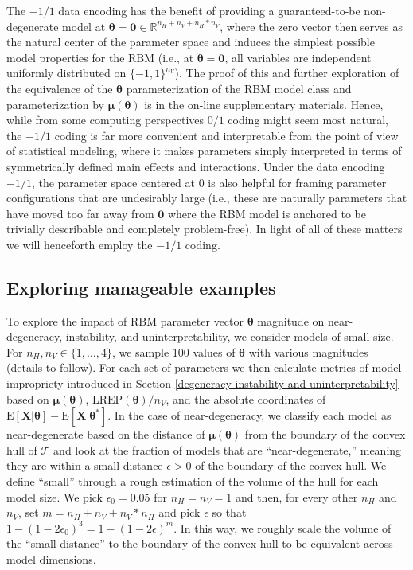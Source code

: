 \documentclass[]{article}
\theoremstyle{definition}
\newcommand{\nv}{{n_{\scriptscriptstyle V}}}
\newcommand{\nh}{{n_{\scriptscriptstyle H}}}
\begin{document}
The \(-1/1\) data encoding has the benefit of providing a
guaranteed-to-be non-degenerate model at
\(\boldsymbol \theta = \boldsymbol 0 \in \mathbb{R}^{\nh + \nv + \nh*\nv}\),
where the zero vector then serves as the natural center of the parameter
space and induces the simplest possible model properties for the RBM
(i.e., at \(\boldsymbol \theta = \boldsymbol 0\), all variables are
independent uniformly distributed on \(\{-1,1\}^\nv\)). The proof of
this and further exploration of the equivalence of the
\(\boldsymbol \theta\) parameterization of the RBM model class and
parameterization by \(\boldsymbol \mu(\boldsymbol \theta)\) is in the
on-line supplementary materials. Hence, while from some computing
perspectives \(0/1\) coding might seem most natural, the \(-1/1\) coding
is far more convenient and interpretable from the point of view of
statistical modeling, where it makes parameters simply interpreted in
terms of symmetrically defined main effects and interactions. Under the
data encoding \(-1/1\), the parameter space centered at 0 is also
helpful for framing parameter configurations that are undesirably large
(i.e., these are naturally parameters that have moved too far away from
\(\bm{0}\) where the RBM model is anchored to be trivially describable
and completely problem-free). In light of all of these matters we will
henceforth employ the \(-1/1\) coding.

\hypertarget{exploring-manageable-examples}{%
\subsection{Exploring manageable
examples}\label{exploring-manageable-examples}}

To explore the impact of RBM parameter vector \(\boldsymbol \theta\)
magnitude on near-degeneracy, instability, and uninterpretability, we
consider models of small size. For \(\nh, \nv \in \{1, \dots, 4\}\), we
sample 100 values of \(\boldsymbol \theta\) with various magnitudes
(details to follow). For each set of parameters we then calculate
metrics of model impropriety introduced in Section
\ref{degeneracy-instability-and-uninterpretability} based on
\(\boldsymbol \mu(\boldsymbol \theta)\),
\(\text{LREP}(\boldsymbol \theta)/\nv\), and the absolute coordinates of
\(\text{E}\left[\boldsymbol X | \boldsymbol \theta\right] - \text{E}\left[\boldsymbol X | \boldsymbol \theta^* \right]\).
In the case of near-degeneracy, we classify each model as
near-degenerate based on the distance of
\(\boldsymbol \mu(\boldsymbol \theta)\) from the boundary of the convex
hull of \(\mathcal{T}\) and look at the fraction of models that are
``near-degenerate,'' meaning they are within a small distance
\(\epsilon > 0\) of the boundary of the convex hull. We define ``small''
through a rough estimation of the volume of the hull for each model
size. We pick \(\epsilon_0 = 0.05\) for \(\nh=\nv=1\) and then, for
every other \(\nh\) and \(\nv\), set \(m=\nh+\nv+\nv*\nh\) and pick
\(\epsilon\) so that \(1-(1-2\epsilon_0)^3 = 1 - (1-2\epsilon)^m\). In
this way, we roughly scale the volume of the ``small distance'' to the
boundary of the convex hull to be equivalent across model dimensions.
\end{document}
